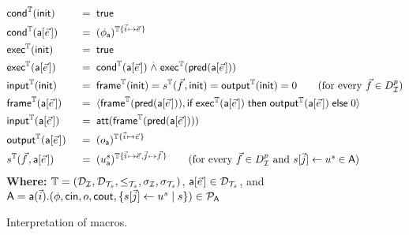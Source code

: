 \begin{figure}[t]
  \begin{alignat*}{2}
    &\mcond^\TM(\tinit) &\;\;=\;\;& \true
    \\
    &\mcond^\TM(\sfa[\pvec{e}]) &\;\;=\;\;&
    \interp{\phi_{\sfa}
    }^{\TM\{\pvec{i} \mapsto \pvec{e}\}}
    \\
    &\mexec^\TM(\tinit) &\;\;=\;\;& \true
    \\
    &\mexec^\TM(\sfa[\pvec{e}]) &\;\;=\;\;&
    \mcond^\TM(\sfa[\pvec{e}])
    \stackrel{.}{\wedge}
    \mexec^\TM(\tpred{\sfa[\pvec{e}]})
    \\
    &\minp^\TM(\tinit) &\;\;=\;\;& \mframe^\TM(\tinit) = s^\TM(\pvec{f},\tinit)
    = \mout^\TM(\tinit) = 0
    \tag{for every $\vec{f} \in D_\I^p$}
    \\
    &\mframe^\TM(\sfa[\pvec{e}]) &\;\;=\;\;&
    \langle \mframe^\TM(\tpred{\sfa[\pvec{e}]}),
    \myif \mexec^\TM(\sfa[\pvec{e}]) \mythen \mout^\TM(\sfa[\pvec{e}]) \myelse 0
    \rangle
    \\
    &\minp^\TM(\sfa[\pvec{e}]) &\;\;=\;\;&
    \att(\mframe^\TM(\tpred{\sfa[\pvec{e}]}))
    \\
    &\mout^\TM(\sfa[\pvec{e}]) &\;\;=\;\;&
    \interp{
      o_{\sfa}
    }^{\TM\{\pvec{i}\mapsto\pvec{e}\}}
    \\
    &s^\TM(\pvec{f},\sfa[\pvec{e}]) &\;\;=\;\;&
    \interp{
      u_{\sfa}^{s}
    }^{
      \TM\{\pvec{i}\mapsto\pvec{e},\pvec{j}\mapsto\pvec{f}\}}
    \tag{for every $\vec{f} \in D_\I^p$ and $s[\vec{j}] \leftarrow u^{s} \in \sfA$}
  \end{alignat*}
  \textbf{Where:} $\mathbb{T} = (\mathcal{D}_{\mathcal{I}}, \mathcal{D}_{\mathcal{T}_s}, \leq_{\mathcal{T}_s}, \sigma_{\mathcal{I}}, \sigma_{\mathcal{T}_s})$, $\sfa[\pvec{e}] \in \D_\XT$, and
  \(
    \textsf{A} = \textsf{a}(\vec{i}).(\phi, \mathsf{cin}, o, \mathsf{cout},
    \{s[\vec{j}] \leftarrow u^{s} \mid s\})
    \in \mathcal{P}_{\textsf{A}}
  \)
  \caption{Interpretation of macros.}
  \label{fig:inter-macros}
\end{figure}


